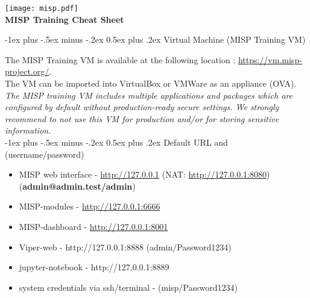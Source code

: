 \documentclass[10pt,landscape]{article}
\makeatletter
\renewcommand{\section}{\@startsection{section}{1}{0mm}%
                                {-1ex plus -.5ex minus -.2ex}%
                                {0.5ex plus .2ex}%
                                {\normalfont\large\bfseries}}
\makeatother
\begin{document}
\raggedright
\footnotesize
\begin{multicols}{3}


\setlength{\premulticols}{1pt}
\setlength{\postmulticols}{1pt}
\setlength{\multicolsep}{1pt}
\setlength{\columnsep}{2pt}

\begin{center}
     \texttt{[image: misp.pdf]}\\
     \Large{\textbf{MISP Training Cheat Sheet}} \\
\end{center}

\section{Virtual Machine (MISP Training VM)}

The MISP Training VM is available at the following location : \url{https://vm.misp-project.org/}.\\
The VM can be imported into VirtualBox or VMWare as an appliance (OVA).\\
{\it The MISP training VM includes multiple applications and packages which are configured by default without
        production-ready secure settings. We strongly recommend to not use this VM for production and/or for storing sensitive information.}\\
\section{Default URL and (username/password)}

        \begin{itemize}
                \item MISP web interface - \url{http://127.0.0.1} (NAT: \url{http://127.0.0.1:8080}) ({\bf admin@admin.test/admin})
                \item MISP-modules - \url{http://127.0.0.1:6666}
                \item MISP-dashboard - \url{http://127.0.0.1:8001}
                \item Viper-web - http://127.0.0.1:8888 (admin/Password1234)
                \item jupyter-notebook - http://127.0.0.1:8889
                \item system credentials via ssh/terminal - (misp/Password1234)
        \end{itemize}


\end{multicols}
\end{document}
